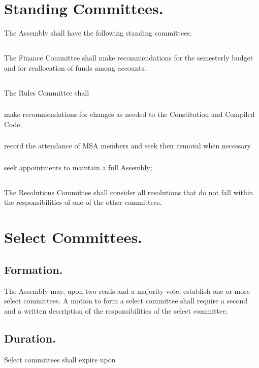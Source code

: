 \documentclass{rules}
\begin{document}
\section{Standing Committees.}
The Assembly shall have the following standing committees.
\subsection{}
The Finance Committee shall make recommendations for the semesterly budget and for reallocation of funds among accounts.
\subsection{}
The Rules Committee shall
\subsubsection{}
make recommendations for changes as needed to the Constitution and Compiled Code.
\subsubsection{}
record the attendance of MSA members and seek their removal when necessary
\subsubsection{}
seek appointments to maintain a full Assembly;
\subsection{}
The Resolutions Committee shall consider all resolutions that do not fall within the responsibilities of one of the other committees.

\section{Select Committees.}
\subsection{Formation.}
The Assembly may, upon two reads and a majority vote, establish one or more select committees.  A motion to form a select committee shall require a second and a written description of the responsibilities of the select committee.
\subsection{Duration.}
Select committees shall expire upon
\end{document}
